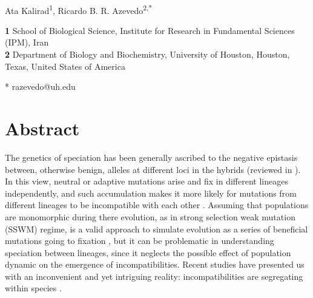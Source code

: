 \documentclass[10pt,letterpaper]{article}
\begin{document}
\vspace*{0.2in}

\begin{flushleft}
{\Large
\textbf{}
}
\newline
\\

Ata Kalirad\textsuperscript{1},
Ricardo B. R. Azevedo\textsuperscript{2,*}

\bigskip
\textbf{1} School of Biological Science, Institute for Research in Fundamental Sciences (IPM), Iran
\\
\textbf{2} Department of Biology and Biochemistry, University of Houston, Houston, Texas, United States of America

\bigskip




* razevedo@uh.edu

\end{flushleft}
\section*{Abstract}

\textbf{}

\hspace{2in}

\linenumbers

The genetics of speciation has been generally ascribed to the negative epistasis between, otherwise benign, alleles at different loci in the hybrids (reviewed in \cite{Maheshwari2011}). In this view, neutral or adaptive mutations arise and fix in different lineages independently, and such accumulation makes it more likely for mutations from different lineages to be incompatible with each other \cite{Orr1995}. Assuming that populations are monomorphic during there evolution, as in strong selection weak mutation (SSWM) regime,  is a valid approach to simulate evolution as a series of beneficial mutations going to fixation \cite{Sniegowski2010}, but it can be problematic in understanding speciation between lineages, since it neglects the possible effect of population dynamic on the emergence of incompatibilities. Recent studies have presented us with an inconvenient and yet intriguing reality: incompatibilities are segregating within species \cite{Seidel2008, Corbett-Detig2013, Hou2014, Chae2014}. 
\end{document}
